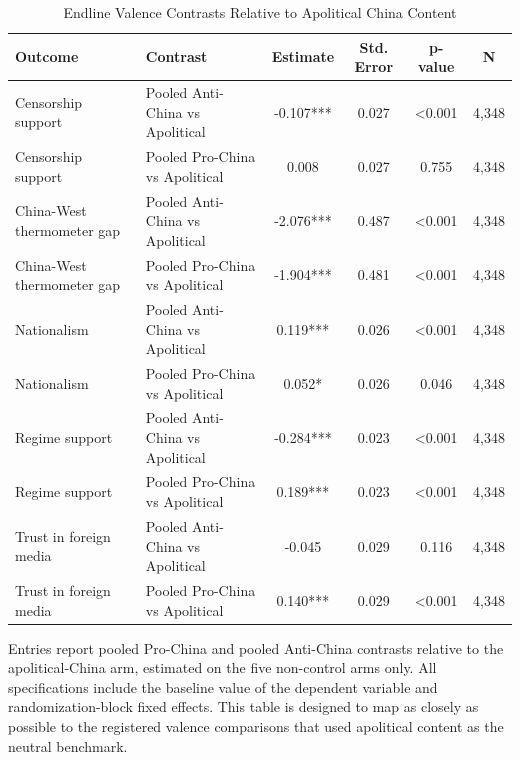 \begin{table}[H]
\centering
\caption{Endline Valence Contrasts Relative to Apolitical China Content}
\label{tab:valence_vs_apolitical_t1}
\footnotesize
\begin{threeparttable}
\begin{tabular}{llcccc}
\toprule
Outcome & Contrast & Estimate & Std. Error & p-value & N \\
\midrule
Censorship support & Pooled Anti-China vs Apolitical & -0.107*** & 0.027 & <0.001 & 4,348 \\
Censorship support & Pooled Pro-China vs Apolitical & 0.008 & 0.027 & 0.755 & 4,348 \\
China-West thermometer gap & Pooled Anti-China vs Apolitical & -2.076*** & 0.487 & <0.001 & 4,348 \\
China-West thermometer gap & Pooled Pro-China vs Apolitical & -1.904*** & 0.481 & <0.001 & 4,348 \\
Nationalism & Pooled Anti-China vs Apolitical & 0.119*** & 0.026 & <0.001 & 4,348 \\
Nationalism & Pooled Pro-China vs Apolitical & 0.052* & 0.026 & 0.046 & 4,348 \\
Regime support & Pooled Anti-China vs Apolitical & -0.284*** & 0.023 & <0.001 & 4,348 \\
Regime support & Pooled Pro-China vs Apolitical & 0.189*** & 0.023 & <0.001 & 4,348 \\
Trust in foreign media & Pooled Anti-China vs Apolitical & -0.045 & 0.029 & 0.116 & 4,348 \\
Trust in foreign media & Pooled Pro-China vs Apolitical & 0.140*** & 0.029 & <0.001 & 4,348 \\
\bottomrule
\end{tabular}
\begin{tablenotes}[flushleft]
\footnotesize
\item Entries report pooled Pro-China and pooled Anti-China contrasts relative to the apolitical-China arm, estimated on the five non-control arms only. All specifications include the baseline value of the dependent variable and randomization-block fixed effects. This table is designed to map as closely as possible to the registered valence comparisons that used apolitical content as the neutral benchmark.
\end{tablenotes}
\end{threeparttable}
\end{table}

